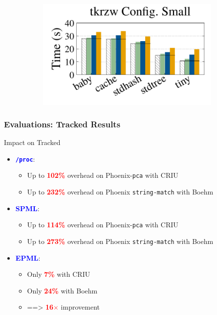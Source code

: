 \documentclass[xcolor=table,bigger,unknownkeysallowed]{beamer}
\newcommand{\myemph}[1]{\textcolor{red}{\bf #1}}
\begin{document}
\begin{frame}
\begin{figure}[!htp]
\begin{subfigure}{\linewidth}
{			\includegraphics[width=.3\linewidth]{fig/tracked_small}
			}			
		\end{subfigure}
	\end{figure}
\end{frame}         
\begin{frame}
	\frametitle{Evaluations: Tracked Results}
	\begin{block}{Impact on Tracked}
		\begin{itemize}	
			\item \textcolor{blue}{\bf \texttt{/proc}}: 
			\begin{itemize}
				\item Up to \myemph{102\%} overhead on Phoenix-\texttt{pca} with CRIU
				\item Up to \myemph{232\%} overhead on Phoenix \texttt{string-match} with Boehm
			\end{itemize}

			\item \textcolor{blue}{\bf SPML}: 
			\begin{itemize}
				\item Up to \myemph{114\%} overhead on Phoenix-\texttt{pca} with CRIU
				\item Up to \myemph{273\%} overhead on Phoenix \texttt{string-match} with Boehm
			\end{itemize}
			
			\item \textcolor{blue}{\bf EPML}: 
			\begin{itemize}
				\item Only \myemph{7\%} with CRIU
				\item Only \myemph{24\%} with Boehm
				\item ==> \myemph{16$\times$} improvement
			\end{itemize}
																			
		\end{itemize}
	\end{block}
\end{frame}              

\end{document}
